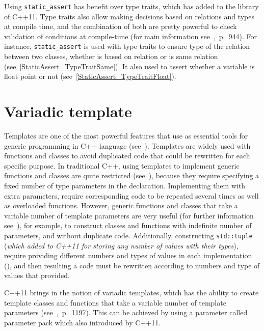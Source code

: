 \documentclass[11pt]{report}
\begin{document}
Using \texttt{static\_assert} has benefit over type traits, which has added to the library of C++11. Type traits also allow making decisions based on relations and types at compile time, and the combination of both are pretty powerful to check validation of conditions at compile-time (for main information see~\cite{Gregorie:professionalcpp},~p.~944). For instance, \texttt{static\_assert} is used with type traits to ensure type of the relation between two classes, whether is based on relation or is same relation (see~\ref{StaticAssert_TypeTraitSame}). It also used to assert whether a variable is float point or not (see~\ref{StaticAssert_TypeTraitFloat}).

\section{Variadic template}
\label{section: Variadic template}
Templates are one of the most powerful features that use as essential tools for generic programming in C++ language (see~\cite{Stroustrup:2012:Cpp11}). Templates are widely used with functions and classes to avoid duplicated code that could be rewritten for each specific purpose. In traditional C++, using templates to implement generic functions and classes are quite restricted (see~\cite{Stroustrup:2012:Cpp11}), because they require specifying a fixed number of type parameters in the declaration. Implementing them with extra parameters, require corresponding code to be repeated several times as well as overloaded functions. However, generic functions and classes that take a variable number of template parameters are very useful (for further information see~\cite{Gregor:2007:VTC}), for example, to construct classes and functions with indefinite number of parameters, and without duplicate code. Additionally, constructing \texttt{std::tuple} (\emph{which added to C++11 for storing any number of values with their types}), require providing different numbers and types of values in each implementation (\cite{Gregor:2007:VTC}), and then resulting a code must be rewritten according to numbers and type of values that provided.

C++11 brings in the notion of variadic templates, which has the ability to create template classes and functions that take a variable number of template parameters (see~\cite{Prata:2012:Cpp},~p.~1197). This can be achieved by using a parameter called parameter pack which also introduced by C++11.
\end{document}
